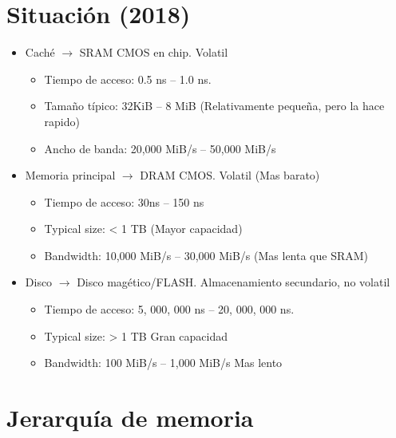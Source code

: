 \documentclass[12pt, twoside, openright]{report} %
\begin{document}
  \section{Situación (2018)}
  \begin{itemize}
    \item Caché $\rightarrow$ SRAM CMOS en chip. Volatil
    \begin{itemize}
      \item Tiempo de acceso: 0.5 ns – 1.0 ns.
      \item Tamaño típico: 32KiB – 8 MiB (Relativamente pequeña, pero la hace rapido)
      \item Ancho de banda: 20,000 MiB/s – 50,000 MiB/s
    \end{itemize}

    \item Memoria principal $\rightarrow$ DRAM CMOS. Volatil (Mas barato)
    \begin{itemize}
      \item Tiempo de acceso: 30ns – 150 ns
      \item Typical size: < 1 TB (Mayor capacidad)
      \item Bandwidth: 10,000 MiB/s – 30,000 MiB/s (Mas lenta que SRAM)
    \end{itemize}

    \item Disco $\rightarrow$ Disco magético/FLASH. Almacenamiento secundario, no volatil
    \begin{itemize}
      \item Tiempo de acceso: 5, 000, 000 ns – 20, 000, 000 ns.
      \item Typical size: > 1 TB Gran capacidad
      \item Bandwidth: 100 MiB/s – 1,000 MiB/s Mas lento
    \end{itemize}
 
  \end{itemize}

    \pagebreak
  \section{Jerarquía de memoria}
\end{document}
